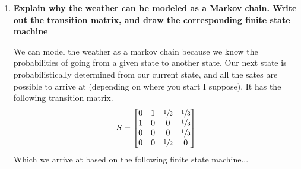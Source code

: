 \documentclass[11pt]{article}
\begin{document}
    \begin{enumerate}
        \item \textbf{Explain why the weather can be modeled as a Markov chain. 
            Write out the transition matrix, and draw the corresponding 
            finite state machine}

            We can model the weather as a markov chain because we know the
            probabilities of going from a given state to another state. Our
            next state is probabilistically determined from our current state,
            and all the sates are possible to arrive at (depending on where you
            start I suppose). It has the following transition matrix.
            \[
                S = 
                \begin{bmatrix}
                    0   &   1   &   \sfrac{1}{2} &   \sfrac{1}{3} \\
                    1   &   0   &   0            &   \sfrac{1}{3} \\
                    0   &   0   &   0            &   \sfrac{1}{3} \\
                    0   &   0   &   \sfrac{1}{2} &   0            \\
                \end{bmatrix}
            \]
            Which we arrive at based on the following finite state machine...

            \begin{center}
\end{center}
\end{enumerate}
\end{document}
